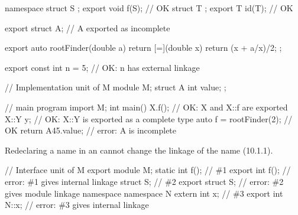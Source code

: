 \begin{std.txt}
\begin{example}
\begin{codeblock}
      namespace {
        struct S { };
      }
      export void f(S);    // OK
      struct T { };
      export T id(T);      // OK
  
      export struct A;     // A exported as incomplete

      export auto rootFinder(double a) {
        return [=](double x) { return (x + a/x)/2; };
      }

      export const int n = 5; // OK: n has external linkage
  
      // Implementation unit of M
      module M;
      struct A {
        int value;
      };
  
      // main program
      import M;
      int main() {
        X{}.f();                // OK: X and X::f are exported
        X::Y y;                 // OK: X::Y is exported as a complete type
        auto f = rootFinder(2); // OK
        return A{45}.value;     // error: A is incomplete
      }
      \end{codeblock}
  \end{example}


  
  \alinea
  \enternote
  Redeclaring a name in an 
  cannot change the linkage of the name (10.1.1).
  \begin{example}
  \begin{codeblock}
    // Interface unit of M
    export module M;
    static int f();             // \#1
    export int f();             // error: \#1 gives internal linkage
    struct S;                   // \#2
    export struct S;            // error: \#2 gives module linkage
    namespace {
      namespace N {
        extern int x;           // \#3
      }
    }
    export int N::x;            // error: \#3 gives internal linkage
  \end{codeblock}
  \end{example}
  \exitnote



\end{std.txt}
